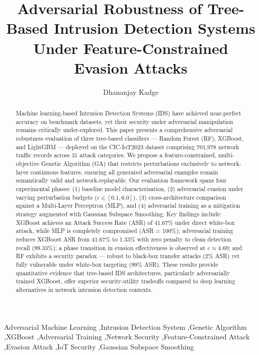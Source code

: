 \documentclass[review,12pt]{elsarticle}
\begin{document}
\begin{frontmatter}

\title{Adversarial Robustness of Tree-Based Intrusion Detection Systems Under Feature-Constrained Evasion Attacks}

\author[a]{Dhananjay Kadge}

\address[a]{School of Engineering Technology, MGM University, Chhatrapati Sambhajinagar, Maharashtra, India}

\begin{abstract}
Machine learning-based Intrusion Detection Systems (IDS) have achieved near-perfect accuracy on benchmark datasets, yet their security under adversarial manipulation remains critically under-explored. This paper presents a comprehensive adversarial robustness evaluation of three tree-based classifiers --- Random Forest (RF), XGBoost, and LightGBM --- deployed on the CIC-IoT2023 dataset comprising 701,978 network traffic records across 31 attack categories. We propose a feature-constrained, multi-objective Genetic Algorithm (GA) that restricts perturbations exclusively to network-layer continuous features, ensuring all generated adversarial examples remain semantically valid and network-replayable. Our evaluation framework spans four experimental phases: (1) baseline model characterisation, (2) adversarial evasion under varying perturbation budgets (\(\varepsilon \in [0.1, 6.0]\)), (3) cross-architecture comparison against a Multi-Layer Perceptron (MLP), and (4) adversarial training as a mitigation strategy augmented with Gaussian Subspace Smoothing. Key findings include: XGBoost achieves an Attack Success Rate (ASR) of 41.67\% under direct white-box attack, while MLP is completely compromised (ASR = 100\%); adversarial training reduces XGBoost ASR from 41.67\% to 1.33\% with zero penalty to clean detection recall (99.33\%); a phase transition in evasion effectiveness is observed at \(\varepsilon \approx 4.69\); and RF exhibits a security paradox --- robust to black-box transfer attacks (2\% ASR) yet fully vulnerable under white-box targeting (99\% ASR). These results provide quantitative evidence that tree-based IDS architectures, particularly adversarially trained XGBoost, offer superior security-utility tradeoffs compared to deep learning alternatives in network intrusion detection contexts.
\end{abstract}

\begin{keyword}
Adversarial Machine Learning \sep Intrusion Detection System \sep Genetic Algorithm \sep XGBoost \sep Adversarial Training \sep Network Security \sep Feature-Constrained Attack \sep Evasion Attack \sep IoT Security \sep Gaussian Subspace Smoothing
\end{keyword}

\end{frontmatter}
\end{document}
